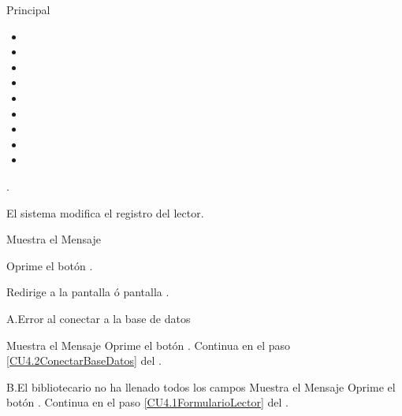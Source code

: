 \begin{UCtrayectoria}{Principal}
			\begin{itemize}
				\item	{} 
				\item	{} 
				\item	{} 
				\item	{} 
				\item	{} 
				\item	{} 
				\item	{}
				\item	{}
				\item	{}
			\end{itemize} 
		.
		
	
		\UCpaso El sistema modifica el registro del lector.

		\UCpaso Muestra el Mensaje 

		\UCpaso[\UCactor] Oprime el botón .

		\UCpaso Redirige a la pantalla  ó pantalla .
		

	\end{UCtrayectoria}





		\begin{UCtrayectoriaA}{A.}{Error al conectar a la base de datos}

			\UCpaso Muestra el Mensaje 
			\UCpaso[\UCactor] Oprime el botón .
			\UCpaso Continua en el paso \ref{CU4.2ConectarBaseDatos} del .

		\end{UCtrayectoriaA}	

				
		\begin{UCtrayectoriaA}{B.}{El bibliotecario no ha llenado todos los campos}
			\UCpaso Muestra el Mensaje 
			\UCpaso[\UCactor] Oprime el botón .
			\UCpaso Continua en el paso \ref{CU4.1FormularioLector} del .
			
		\end{UCtrayectoriaA}

